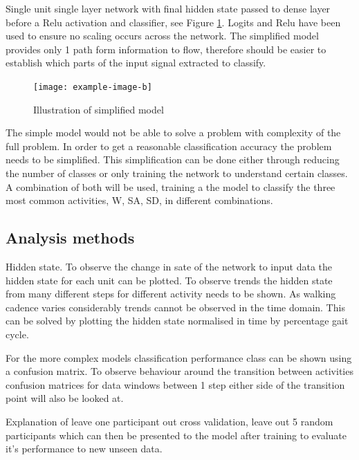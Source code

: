 \documentclass[sensors,article,submit,moreauthors,pdftex]{Definitions/mdpi}
\begin{document}
Single unit single layer network with final hidden state passed to dense layer before a Relu activation and classifier, see Figure \ref{fig:simplifier_lstm_model}. Logits and Relu have been used to ensure no scaling occurs across the network. The simplified model provides only 1 path form information to flow, therefore should be easier to establish which parts of the input signal extracted to classify.

\begin{figure}[!htb]
    \centering
    \texttt{[image: example-image-b]}
    \caption{Illustration of simplified model}
    \label{fig:simplifier_lstm_model}
\end{figure}

The simple model would not be able to solve a problem with complexity of the full problem. In order to get a reasonable classification accuracy the problem needs to be simplified. This simplification can be done either through reducing the number of classes or only training the network to understand certain classes. A combination of both will be used, training a the model to classify the three most common activities, W, SA, SD, in different combinations.

\subsection{Analysis methods}
Hidden state. 
To observe the change in sate of the network to input data the hidden state for each unit can be plotted. To observe trends the hidden state from many different steps for different activity needs to be shown. As walking cadence varies considerably trends cannot be observed in the time domain. This can be solved by plotting the hidden state normalised in time by percentage gait cycle.

For the more complex models classification performance class can be shown using a confusion matrix. To observe behaviour around the transition between activities confusion matrices for data windows between 1 step either side of the transition point will also be looked at.

Explanation of leave one participant out cross validation, leave out 5 random participants which can then be presented to the model after training to evaluate it's performance to new unseen data.
\end{document}
